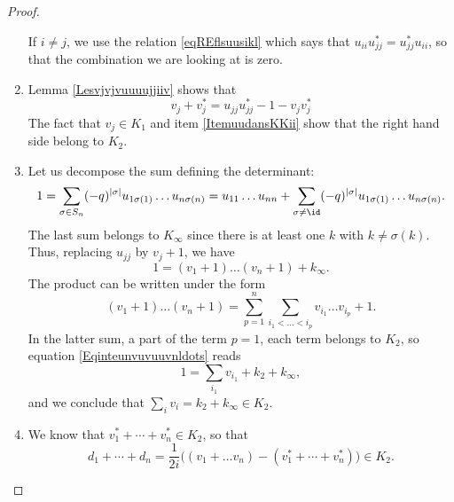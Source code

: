 \begin{proof}
\begin{enumerate}
            If $i\neq j$, we use the relation \eqref{eqREflsuusikl} which says that $u_{ii}u_{jj}^*=u_{jj}^*u_{ii}$, so that the combination we are looking at is zero.
        \item
            Lemma \ref{Lesvjvjvuuuujjiiv} shows that
            \begin{equation}        \label{Eqvvuiiujjvv}
                v_j+v_j^*=u_{jj}u_{jj}^*-1-v_jv_j^*
            \end{equation}
            The fact that $v_j\in K_1$ and item \ref{ItemuudansKKii} show that the right hand side belong to $K_2$.        
        \item
            Let us decompose the sum defining the determinant:
            \begin{equation}
                1=\sum_{\sigma\in S_n}(-q)^{| \sigma |}u_{1\sigma(1)}\ldots u_{n\sigma(n)}=u_{11}\ldots u_{nn}+\sum_{\sigma\neq \id}(-q)^{| \sigma |}u_{1\sigma(1)}\ldots u_{n\sigma(n)}.
            \end{equation}
            The last sum belongs to $K_{\infty}$ since there is at least one $k$ with $k\neq \sigma(k)$. Thus, replacing $u_{jj}$ by $v_j+1$,  we have
            \begin{equation}        \label{Eqinteunvuvuuvnldots}
                1=(v_1+1)\ldots (v_n+1)+k_{\infty}.
            \end{equation}
            The product can be written under the form
            \begin{equation}
                (v_1+1)\ldots(v_n+1)=\sum_{p=1}^n\sum_{i_1<\ldots<i_p}v_{i_1}\ldots v_{i_p}+1.
            \end{equation}
            In the latter sum, a part of the term $p=1$, each term belongs to $K_2$, so equation \eqref{Eqinteunvuvuuvnldots} reads
            \begin{equation}
                1=\sum_{i_1}v_{i_1}+k_2+k_{\infty},
            \end{equation}
            and we conclude that $\sum_iv_i=k_2+k_{\infty}\in K_2$.
        \item
            We know that $v_1^*+\cdots +v_n^*\in K_2$, so that
            \begin{equation}
                d_1+\cdots+ d_n=\frac{1}{ 2i }\big( (v_1+\ldots v_n)-(v_1^*+\cdots +v_n^*) \big)\in K_2.
            \end{equation}
    \end{enumerate}
    
\end{proof}

